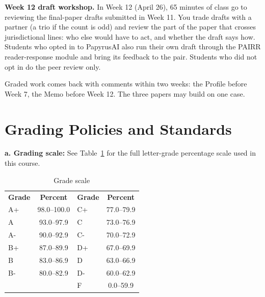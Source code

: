 \documentclass[12pt]{article}
\newcommand\tagpdfsetup[1]{}
\begin{document}
\textbf{Week 12 draft workshop.} In Week 12 (April 26), 65 minutes of class go to reviewing the final-paper drafts submitted in Week 11. You trade drafts with a partner (a trio if the count is odd) and review the part of the paper that crosses jurisdictional lines: who else would have to act, and whether the draft says how. Students who opted in to PapyrusAI also run their own draft through the PAIRR reader-response module and bring its feedback to the pair. Students who did not opt in do the peer review only.

Graded work comes back with comments within two weeks: the Profile before Week 7, the Memo before Week 12. The three papers may build on one case.

\section*{Grading Policies and Standards}

\noindent \textbf{a. Grading scale:}
\noindent See Table~\ref{tab:grading-scale} for the full letter-grade percentage scale used in this course.
\begin{center}
\begin{table}[h]
    \caption{Grade scale}
    \label{tab:grading-scale}
    \centering
    \tagpdfsetup{table/header-rows={1}}
    \begin{tabular}{l c l c}
    \rowcolor{gray!20}
    \textbf{Grade} & \textbf{Percent} & \textbf{Grade} & \textbf{Percent} \\
    A+    & 98.0--100.0 & C+ & 77.0--79.9 \\
    A     & 93.0--97.9  & C  & 73.0--76.9 \\
    A-    & 90.0--92.9  & C- & 70.0--72.9 \\
    B+    & 87.0--89.9  & D+ & 67.0--69.9 \\
    B     & 83.0--86.9  & D  & 63.0--66.9 \\
    B-    & 80.0--82.9  & D- & 60.0--62.9 \\
          &             & F  & 0.0--59.9 \\
    \end{tabular}
\end{table}
\end{center}
\end{document}
